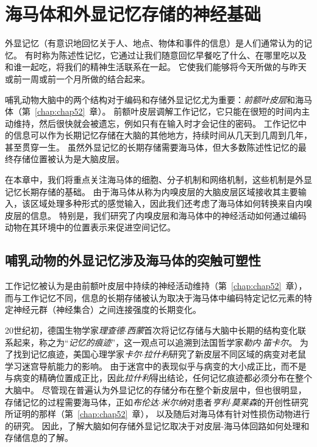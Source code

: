 \chapter{海马体和外显记忆存储的神经基础} \label{chap:chap54}

外显记忆（有意识地回忆关于人、地点、物体和事件的信息）是人们通常认为的记忆。
有时称为陈述性记忆，它通过让我们随意回忆早餐吃了什么、在哪里吃以及和谁一起吃，将我们的精神生活联系在一起。
它使我们能够将今天所做的与昨天或前一周或前一个月所做的结合起来。


哺乳动物大脑中的两个结构对于编码和存储外显记忆尤为重要：\textit{前额叶皮层}和海马体（第~\ref{chap:chap52}~章）。
前额叶皮层调解工作记忆，它只能在很短的时间内主动维持，然后很快就会被遗忘，例如只有在输入时才会记住的密码。
工作记忆中的信息可以作为长期记忆存储在大脑的其他地方，持续时间从几天到几周到几年，甚至贯穿一生。
虽然外显记忆的长期存储需要海马体，但大多数陈述性记忆的最终存储位置被认为是大脑皮层。


在本章中，我们将重点关注海马体的细胞、分子机制和网络机制，这些机制是外显记忆长期存储的基础。
由于海马体从称为内嗅皮层的大脑皮层区域接收其主要输入，该区域处理多种形式的感觉输入，因此我们还考虑了海马体如何转换来自内嗅皮层的信息。
特别是，我们研究了内嗅皮层和海马体中的神经活动如何通过编码动物在其环境中的位置表示来促进空间记忆。



\section{哺乳动物的外显记忆涉及海马体的突触可塑性}

工作记忆被认为是由前额叶皮层中持续的神经活动维持（第~\ref{chap:chap52}~章），而与工作记忆不同，信息的长期存储被认为取决于海马体中编码特定记忆元素的特定神经元群（神经集合）之间连接强度的长期变化。


20世纪初，德国生物学家\textit{理查德$\cdot$西蒙}首次将记忆存储与大脑中长期的结构变化联系起来，称之为“\textit{记忆的痕迹}”，这一观点可以追溯到法国哲学家\textit{勒内$\cdot$笛卡尔}。
为了找到记忆痕迹，美国心理学家\textit{卡尔$\cdot$拉什利}研究了新皮层不同区域的病变对老鼠学习迷宫导航能力的影响。
由于迷宫中的表现似乎与病变的大小成正比，而不是与病变的精确位置成正比，因此\textit{拉什利}得出结论，任何记忆痕迹都必须分布在整个大脑中。
尽管现在普遍认为外显记忆的存储分布在整个新皮层中，但也很明显，存储记忆的过程需要海马体，正如\textit{布伦达$\cdot$米尔纳}对患者\textit{亨利$\cdot$莫莱森}的开创性研究所证明的那样（第~\ref{chap:chap52}~章），
以及随后对海马体有针对性损伤动物进行的研究。
因此，了解大脑如何存储外显记忆取决于对皮层-海马体回路如何处理和存储信息的了解。


